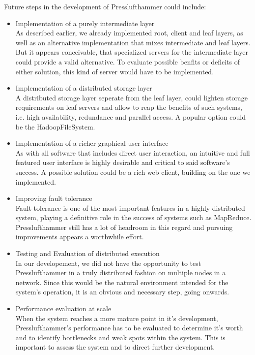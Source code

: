   Future steps in the development of Presslufthammer could include:
  \begin{itemize}
    \item Implementation of a purely intermediate layer\\
      As described earlier, we already implemented root, client and leaf layers,
      as well as an alternative implementation that mixes intermediate and leaf
      layers. But it appears conceivable, that specialized servers for the
      intermediate layer could provide a valid alternative.
      To evaluate possible benfits or deficits of either solution, this kind of
      server would have to be implemented.
    
    \item Implementation of a distributed storage layer\\
      A distributed storage layer seperate from the leaf layer, could lighten
      storage requirements on leaf servers and allow to reap the benefits of
      such systems, i.e. high availability, redundance and parallel access.
      A popular option could be the HadoopFileSystem.
    
    \item Implementation of a richer graphical user interface\\
      As with all software that includes direct user interaction, an intuitive
      and full featured user interface is highly desirable and critical to 
      said software's success. A possible solution could be a rich web client,
      building on the one we implemented.
    
    \item Improving fault tolerance\\
      Fault tolerance is one of the most important features in a highly
      distributed system, playing a definitive role in the success of systems
      such as MapReduce. Presslufthammer still has a lot of headroom in this
      regard and pursuing improvements appears a worthwhile effort.
    
    \item Testing and Evaluation of distributed execution\\
      In our developement, we did not have the opportunity to test
      Presslufthammer in a truly distributed fashion on multiple nodes in a
      network. Since this would be the natural environment intended for the
      system's operation, it is an obvious and necessary step, going onwards.
    
    \item Performance evaluation at scale\\
      When the system reaches a more mature point in it's development,
      Presslufthammer's performance has to be evaluated to determine it's worth
      and to identify bottlenecks and weak spots within the system. This is
      important to assess the system and to direct further development.
    
  \end{itemize}


